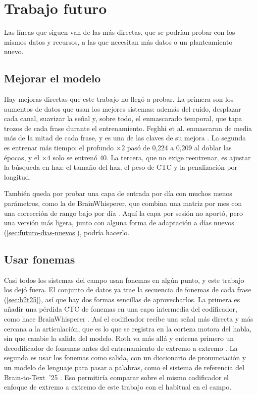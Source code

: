 \section{Trabajo futuro}
\label{sec:trabajo-futuro}

Las líneas que siguen van de las más directas, que se podrían probar con los mismos datos y recursos, a las que necesitan más datos o un planteamiento nuevo.

\subsection{Mejorar el modelo}

Hay mejoras directas que este trabajo no llegó a probar. La primera son los aumentos de datos que usan los mejores sistemas: además del ruido, desplazar cada canal, suavizar la señal y, sobre todo, el enmascarado temporal, que tapa trozos de cada frase durante el entrenamiento. Feghhi et al. enmascaran de media más de la mitad de cada frase, y es una de las claves de su mejora \cite{feghhi2025timemasked}. La segunda es entrenar más tiempo: el profundo $\times 2$ pasó de 0,224 a 0,209 al doblar las épocas, y el $\times 4$ solo se entrenó 40. La tercera, que no exige reentrenar, es ajustar la búsqueda en haz: el tamaño del haz, el peso de CTC y la penalización por longitud.

También queda por probar una capa de entrada por día con muchos menos parámetros, como la de BrainWhisperer, que combina una matriz por mes con una corrección de rango bajo por día \cite{brainwhisperer}. Aquí la capa por sesión no aportó, pero una versión más ligera, junto con alguna forma de adaptación a días nuevos (\cref{sec:futuro-dias-nuevos}), podría hacerlo.

\subsection{Usar fonemas}

Casi todos los sistemas del campo usan fonemas en algún punto, y este trabajo los dejó fuera. El conjunto de datos ya trae la secuencia de fonemas de cada frase (\cref{sec:b2t25}), así que hay dos formas sencillas de aprovecharlos. La primera es añadir una pérdida CTC de fonemas en una capa intermedia del codificador, como hace BrainWhisperer \cite{brainwhisperer}. Así el codificador recibe una señal más directa y más cercana a la articulación, que es lo que se registra en la corteza motora del habla, sin que cambie la salida del modelo. Roth va más allá y entrena primero un decodificador de fonemas antes del entrenamiento de extremo a extremo \cite{roth2026}. La segunda es usar los fonemas como salida, con un diccionario de pronunciación y un modelo de lenguaje para pasar a palabras, como el sistema de referencia del Brain-to-Text~'25 \cite{b2t25}. Eso permitiría comparar sobre el mismo codificador el enfoque de extremo a extremo de este trabajo con el habitual en el campo.

